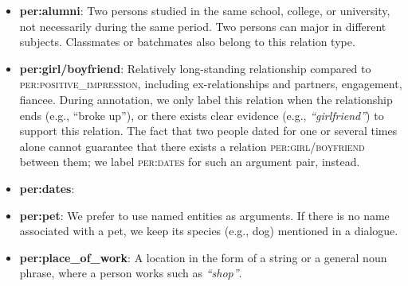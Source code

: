 \documentclass[11pt,a4paper]{article}
\newcommand{\eg}{{e.g.}}
\begin{document}
\begin{itemize}
    \item \textbf{per:alumni}: Two persons studied in the same school, college, or university, not necessarily during the same period. Two persons can major in different subjects. Classmates or batchmates also belong to this relation type.  


    \item \textbf{per:girl/boyfriend}:  Relatively long-standing relationship compared to \textsc{per:positive\_impression}, including ex-relationships and partners, engagement, fiancee.  During annotation, we only label this relation when the relationship ends (e.g., “broke up”), or there exists clear evidence (\eg, \emph{``girlfriend''}) to support this relation. The fact that two people dated for one or several times alone cannot guarantee that there exists a relation \textsc{per:girl/boyfriend} between them; we label \textsc{per:dates} for such an argument pair, instead. 
    
    \item \textbf{per:dates}:

    \item \textbf{per:pet}: We prefer to use named entities as arguments. If there is no name associated with a pet, we keep its species (\eg, dog) mentioned in a dialogue.






    \item \textbf{per:place\_of\_work}: A location in the form of a string or a general noun phrase, where a person works such as \emph{``shop''}.



\end{itemize}
\fi 
\end{document}

